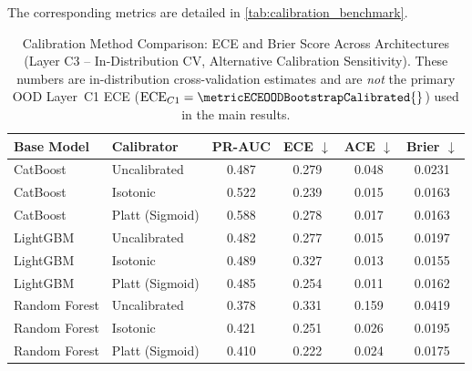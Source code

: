 

The corresponding metrics are detailed in \autoref{tab:calibration_benchmark}.

\begin{table}[htbp]
\centering
\caption[Calibration Method Comparison]{Calibration Method Comparison: ECE and Brier Score Across Architectures (Layer C3 -- In-Distribution CV, Alternative Calibration Sensitivity). These numbers are in-distribution cross-validation estimates and are \textit{not} the primary OOD Layer~C1 ECE ($\text{ECE}_{C1} = \metricECEOODBootstrapCalibrated{}$) used in the main results.}
\label{tab:calibration_benchmark}
\renewcommand{\arraystretch}{1.2}
\begin{tabular}{llcccc}
\toprule
\textbf{Base Model} & \textbf{Calibrator} & \textbf{PR-AUC} & \textbf{ECE $\downarrow$} & \textbf{ACE $\downarrow$} & \textbf{Brier $\downarrow$} \\
\midrule
CatBoost & Uncalibrated & 0.487 & 0.279 & 0.048 & 0.0231 \\
CatBoost & Isotonic & 0.522 & 0.239 & 0.015 & 0.0163 \\
CatBoost & Platt (Sigmoid) & 0.588 & 0.278 & 0.017 & 0.0163 \\
LightGBM & Uncalibrated & 0.482 & 0.277 & 0.015 & 0.0197 \\
LightGBM & Isotonic & 0.489 & 0.327 & 0.013 & 0.0155 \\
LightGBM & Platt (Sigmoid) & 0.485 & 0.254 & 0.011 & 0.0162 \\
Random Forest & Uncalibrated & 0.378 & 0.331 & 0.159 & 0.0419 \\
Random Forest & Isotonic & 0.421 & 0.251 & 0.026 & 0.0195 \\
Random Forest & Platt (Sigmoid) & 0.410 & 0.222 & 0.024 & 0.0175 \\
\bottomrule
\end{tabular}
\end{table}

